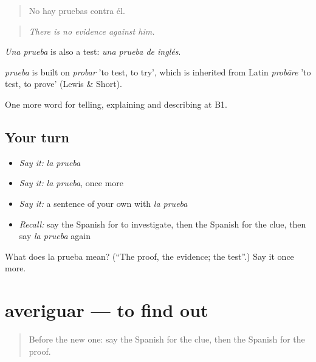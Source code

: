 \begin{quote}
No hay pruebas contra él.
\end{quote}

\begin{quote}
\emph{There is no evidence against him.}
\end{quote}

\emph{Una prueba} is also a test: \emph{una prueba de inglés}.

\begin{cousinweb}
\emph{prueba} is built on \emph{probar} 'to test, to try', which is inherited from Latin \emph{probāre} 'to test, to prove' (Lewis \& Short).
\end{cousinweb}

\begin{grammarlens}[title={What you've built}]
One more word for telling, explaining and describing at B1.
\end{grammarlens}

\subsection*{Your turn}
\begin{itemize}
\raggedright
  \item \emph{Say it:} \emph{la prueba}
  \item \emph{Say it:} \emph{la prueba}, once more
  \item \emph{Say it:} a sentence of your own with \emph{la prueba}
  \item \emph{Recall:} say the Spanish for to investigate, then the Spanish for the clue, then say \emph{la prueba} again
\end{itemize}

\begin{tcolorbox}[breakable,colback=teal!4,colframe=teal!35!black,title={Before you move on}]
What does la prueba mean? (\textquotedblleft{}The proof, the evidence; the test\textquotedblright{}.) Say it once more.
\end{tcolorbox}
\section[averiguar]{averiguar — to find out}

\label{lesson:ES-C521-averiguar}



\begin{quote}
Before the new one: say the Spanish for the clue, then the Spanish for the proof.
\end{quote}


